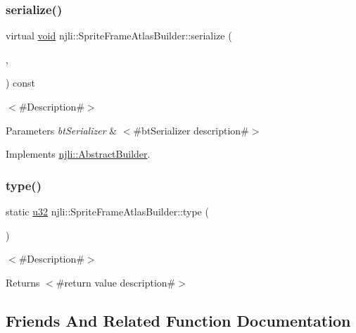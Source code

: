 \subsubsection{\texorpdfstring{serialize()}{serialize()}}
{\footnotesize\ttfamily virtual \mbox{\hyperlink{_thread_8h_af1e856da2e658414cb2456cb6f7ebc66}{void}} njli\+::\+Sprite\+Frame\+Atlas\+Builder\+::serialize (\begin{DoxyParamCaption}\item[{\mbox{\hyperlink{_thread_8h_af1e856da2e658414cb2456cb6f7ebc66}{void}} $\ast$}]{,  }\item[{bt\+Serializer $\ast$}]{ }\end{DoxyParamCaption}) const\hspace{0.3cm}{\ttfamily [virtual]}}

$<$\#\+Description\#$>$


\begin{DoxyParams}{Parameters}
{\em bt\+Serializer} & $<$\#bt\+Serializer description\#$>$ \\
\hline
\end{DoxyParams}


Implements \mbox{\hyperlink{classnjli_1_1_abstract_builder_ab66b774e02ccb9da554c9aab7fa6d981}{njli\+::\+Abstract\+Builder}}.

\mbox{\label{classnjli_1_1_sprite_frame_atlas_builder_afa4a71dfece90df012bf601ab30e4548}} 
\subsubsection{\texorpdfstring{type()}{type()}}
{\footnotesize\ttfamily static \mbox{\hyperlink{_util_8h_a10e94b422ef0c20dcdec20d31a1f5049}{u32}} njli\+::\+Sprite\+Frame\+Atlas\+Builder\+::type (\begin{DoxyParamCaption}{ }\end{DoxyParamCaption})\hspace{0.3cm}{\ttfamily [static]}}

$<$\#\+Description\#$>$

\begin{DoxyReturn}{Returns}
$<$\#return value description\#$>$ 
\end{DoxyReturn}


\subsection{Friends And Related Function Documentation}
\mbox{\label{classnjli_1_1_sprite_frame_atlas_builder_acb96ebb09abe8f2a37a915a842babfac}} 
